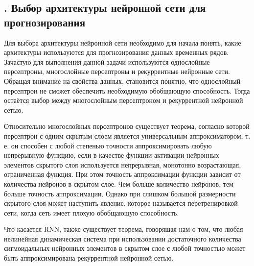\setcounter{chaptercntr}{4}



\titlespace

\subsection*{ 
  \gostTitleFont
  \redline
  \thechaptercntr .\thesubchaptercntr \spc 
  Выбор архитектуры нейронной сети для прогнозирования
} \addtocounter{subchaptercntr}{1} 

\subtitlespace

{\gostFont

  \par \redline Для выбора архитектуры нейронной сети необходимо для начала понять, какие архитектуры используются для прогнозирования данных временных рядов. Зачастую для выполнения данной задачи используются однослойные персептроны, многослойные персептроны и рекуррентные нейронные сети. Обращая внимание на свойства данных, становится понятно, что однослойный персептрон не сможет обеспечить необходимую обобщающую способность. Тогда остаётся выбор между многослойным персептроном и рекуррентной нейронной сетью. 
  
  \par \redline Относительно многослойных персептронов существует теорема, согласно которой персептрон с одним скрытым слоем является универсальным аппроксиматором, т. е. он способен с любой степенью точности аппроксимировать любую непрерывную функцию, если в качестве функции активации нейронных элементов скрытого слоя используется непрерывная, монотонно возрастающая, ограниченная функция. При этом точность аппроксимации функции зависит от количества нейронов в скрытом слое. Чем больше количество нейронов, тем больше точность аппроксимации. Однако при слишком большой размерности скрытого слоя может наступить явление, которое называется перетренировкой сети, когда сеть имеет плохую обобщающую способность.  

  \par \redline Что касается RNN, также существует теорема, говорящая нам о том, что любая нелинейная динамическая система при использовании достаточного количества сигмоидальных нейронных элементов в скрытом слое с любой точностью может быть аппроксимирована рекуррентной нейронной сетью. 

}
